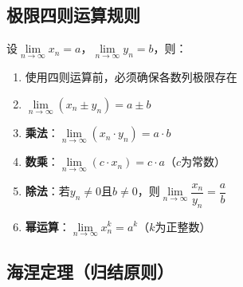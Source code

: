 \documentclass[a4paper,12pt]{article}
\begin{document}
    \subsection{极限四则运算规则}

    设$\lim\limits_{n\to\infty} x_n = a$，$\lim\limits_{n\to\infty} y_n = b$，则：

    \begin{enumerate}
        \item 使用四则运算前，必须确保各数列极限存在
        \item $\lim\limits_{n\to\infty} (x_n \pm y_n) = a \pm b$

        \item \textbf{乘法}：$\lim\limits_{n\to\infty} (x_n \cdot y_n) = a \cdot b$

        \item \textbf{数乘}：$\lim\limits_{n\to\infty} (c \cdot x_n) = c \cdot a$（$c$为常数）

        \item \textbf{除法}：若$y_n \neq 0$且$b \neq 0$，则$\lim\limits_{n\to\infty} \dfrac{x_n}{y_n} = \dfrac{a}{b}$

        \item \textbf{幂运算}：$\lim\limits_{n\to\infty} x_n^k = a^k$（$k$为正整数）
    \end{enumerate}

    \subsection{海涅定理（归结原则）}
\end{document}
